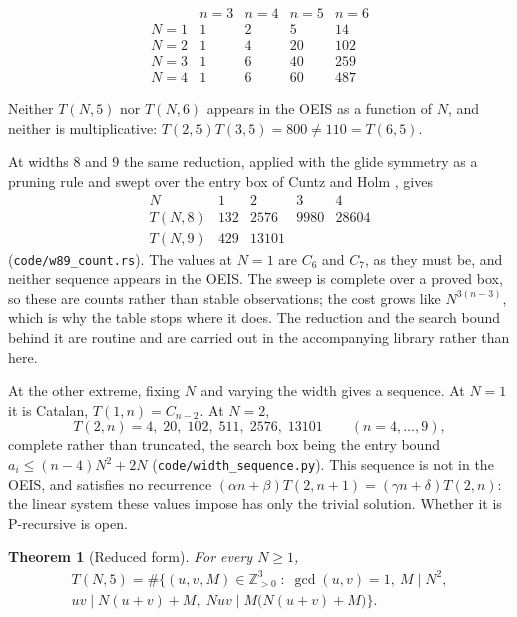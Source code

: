 \documentclass[11pt]{article}
\theoremstyle{plain}
\newtheorem{theorem}{Theorem}[section]
\theoremstyle{definition}
\newcommand{\Z}{\mathbb{Z}}
\begin{document}
\[
\begin{array}{c|ccccc}
 & n=3 & n=4 & n=5 & n=6 \\\hline
N=1 & 1 & 2 & 5 & 14\\
N=2 & 1 & 4 & 20 & 102\\
N=3 & 1 & 6 & 40 & 259\\
N=4 & 1 & 6 & 60 & 487
\end{array}
\]

Neither $T(N,5)$ nor $T(N,6)$ appears in the OEIS as a function of $N$, and neither is
multiplicative: $T(2,5)T(3,5)=800\ne 110=T(6,5)$.

At widths $8$ and $9$ the same reduction, applied with the glide symmetry as a pruning rule
and swept over the entry box of Cuntz and Holm \cite{CH19}, gives
\[
\begin{array}{c|cccc}
  N & 1 & 2 & 3 & 4\\ \hline
  T(N,8) & 132 & 2576 & 9980 & 28604\\
  T(N,9) & 429 & 13101 & &
\end{array}
\]
(\texttt{code/w89\_count.rs}). The values at $N=1$ are $C_6$ and $C_7$, as they must be, and
neither sequence appears in the OEIS. The sweep is complete over a proved box, so these are
counts rather than stable observations; the cost grows like $N^{3(n-3)}$, which is why the
table stops where it does. The reduction and the search bound behind it are routine and are
carried out in the accompanying library rather than here.

At the other extreme, fixing $N$ and varying the width gives a sequence. At $N=1$ it is
Catalan, $T(1,n)=C_{n-2}$. At $N=2$,
\[
  T(2,n)=4,\;20,\;102,\;511,\;2576,\;13101\qquad (n=4,\dots,9),
\]
complete rather than truncated, the search box being the entry bound $a_i\le(n-4)N^2+2N$
(\texttt{code/width\_sequence.py}). This sequence is not in the OEIS, and satisfies no
recurrence $(\alpha n+\beta)T(2,n+1)=(\gamma n+\delta)T(2,n)$: the linear system these values
impose has only the trivial solution. Whether it is P-recursive is open.

\begin{theorem}[Reduced form]\label{thm:t5red}
For every $N\ge1$,
\begin{multline*}
  T(N,5)=\#\bigl\{(u,v,M)\in\Z_{>0}^{3} \;:\; \gcd(u,v)=1,\ M\mid N^2,\\
  uv\mid N(u+v)+M,\ Nuv \mid M\bigl(N(u+v)+M\bigr)\bigr\}.
\end{multline*}
\end{theorem}
\end{document}
